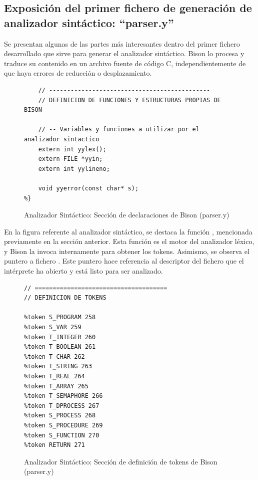 \subsection{Exposición del primer fichero de generación de analizador sintáctico: ``parser.y''}
Se presentan algunas de las partes más interesantes dentro del primer fichero desarrollado que sirve para generar el analizador sintáctico. Bison lo procesa y traduce su contenido en un archivo fuente de código C, independientemente de que haya errores de reducción o desplazamiento.

\begin{figure}[h]
\begin{lstlisting}[style=customflex]
%{
    // ---------------------------------------------
    // DEFINICION DE FUNCIONES Y ESTRUCTURAS PROPIAS DE BISON

    // -- Variables y funciones a utilizar por el analizador sintactico
    extern int yylex();
    extern FILE *yyin;
    extern int yylineno;

    void yyerror(const char* s);  
%}
\end{lstlisting}
\caption{Analizador Sintáctico: Sección de declaraciones de Bison (parser.y)}
\label{fig:bisonDeclaraciones}
\end{figure}

En la figura referente al analizador sintáctico, se destaca la función , mencionada previamente en la sección anterior. Esta función es el motor del analizador léxico, y Bison la invoca internamente para obtener los tokens. Asimismo, se observa el puntero a fichero . Este puntero hace referencia al descriptor del fichero que el intérprete ha abierto y está listo para ser analizado.

\newpage

\begin{figure}[h]
\begin{lstlisting}[style=customflex]
// =====================================
// DEFINICION DE TOKENS

%token S_PROGRAM 258
%token S_VAR 259
%token T_INTEGER 260
%token T_BOOLEAN 261
%token T_CHAR 262
%token T_STRING 263
%token T_REAL 264
%token T_ARRAY 265
%token T_SEMAPHORE 266
%token T_DPROCESS 267
%token S_PROCESS 268
%token S_PROCEDURE 269
%token S_FUNCTION 270
%token RETURN 271
\end{lstlisting}
\caption{Analizador Sintáctico: Sección de definición de tokens de Bison (parser.y)}
\label{fig:bisonTokens}
\end{figure}


